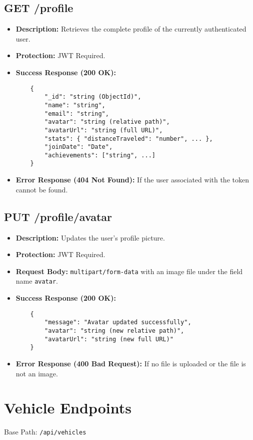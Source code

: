 \subsection{GET /profile}
\begin{itemize}
    \item \textbf{Description:} Retrieves the complete profile of the currently authenticated user.
    \item \textbf{Protection:} JWT Required.
    \item \textbf{Success Response (200 OK):}
    \begin{verbatim}
    {
        "_id": "string (ObjectId)",
        "name": "string",
        "email": "string",
        "avatar": "string (relative path)",
        "avatarUrl": "string (full URL)",
        "stats": { "distanceTraveled": "number", ... },
        "joinDate": "Date",
        "achievements": ["string", ...]
    }
    \end{verbatim}
    \item \textbf{Error Response (404 Not Found):} If the user associated with the token cannot be found.
\end{itemize}

\subsection{PUT /profile/avatar}
\begin{itemize}
    \item \textbf{Description:} Updates the user's profile picture.
    \item \textbf{Protection:} JWT Required.
    \item \textbf{Request Body:} \texttt{multipart/form-data} with an image file under the field name \texttt{avatar}.
    \item \textbf{Success Response (200 OK):}
    \begin{verbatim}
    {
        "message": "Avatar updated successfully",
        "avatar": "string (new relative path)",
        "avatarUrl": "string (new full URL)"
    }
    \end{verbatim}
    \item \textbf{Error Response (400 Bad Request):} If no file is uploaded or the file is not an image.
\end{itemize}

\section{Vehicle Endpoints}
Base Path: \texttt{/api/vehicles}

